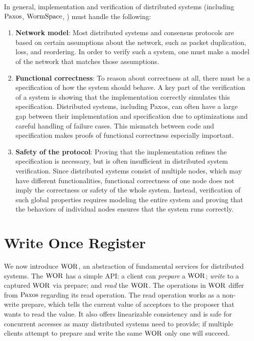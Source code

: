 In general, implementation and verification of distributed systems
(including $\mathrm{Paxos}$, $\mathrm{WormSpace}$, \etc) must handle the following:
\begin{enumerate}
\item \textbf{Network model}:
Most distributed systems and consensus protocols are based on certain assumptions about the network,
such as packet duplication, loss, and reordering. In order to verify such a system, one must make a model of the network that matches
those assumptions.

\item \textbf{Functional correctness}: 
To reason about correctness at all, there must be a specification of how the system should behave.
A key part of the verification of a system is showing that the implementation correctly simulates this specification.
Distributed systems, including Paxos, can often have a large gap between their implementation and specification due to optimizations and careful handling of failure cases.
This mismatch between code and specification makes proofs of functional correctness especially important.

\item \textbf{Safety of the protocol}: 
Proving that the implementation refines the specification is necessary, but is often insufficient in distributed system verification.
Since distributed systems consist of multiple nodes, which may have different functionalities,
functional correctness of one node does not imply the correctness or safety of the whole system.
Instead, verification of such global properties requires modeling the entire system and
proving that the behaviors of individual nodes ensures that the system runs correctly.
\end{enumerate}

\section{Write Once Register}
\label{chapter:wormspace:sec:write-once-register}

We now introduce $\mathrm{WOR}$, an abstraction of fundamental services for distributed systems. 
The $\mathrm{WOR}$ has a simple API: a client can \textit{prepare} a $\mathrm{WOR}$; \textit{write} to a captured $\mathrm{WOR}$ via prepare; and \textit{read} the  $\mathrm{WOR}$. 
The operations in $\mathrm{WOR}$ differ from $\mathrm{Paxos}$ regarding its read operation. 
The read operation works as a non-write prepare, which tells the current value of acceptors to the proposer that wants to read the value.
It also offers linearizable consistency and is safe for concurrent accesses as many distributed systems need to provide; 
if multiple clients attempt to prepare and write the same $\mathrm{WOR}$ only one will succeed.

